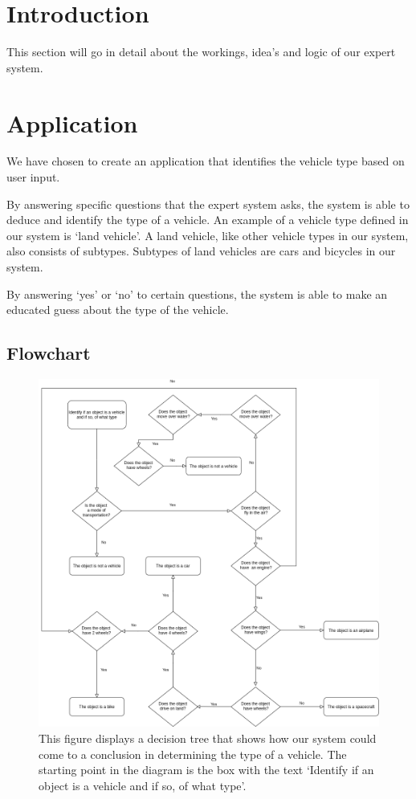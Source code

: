 \section{Introduction} \label{man-introduction}
This section will go in detail about the workings, idea's and logic of our expert system.

\section{Application} \label{man-application}
We have chosen to create an application that identifies the vehicle type based on user input.

By answering specific questions that the expert system asks,
the system is able to deduce and identify the type of a vehicle.
An example of a vehicle type defined in our system is `land vehicle'.
A land vehicle, like other vehicle types in our system, also consists
of subtypes. Subtypes of land vehicles are cars and bicycles in our system.

By answering `yes' or `no' to certain questions,
the system is able to make an educated
guess about the type of the vehicle.

\subsection{Flowchart} \label{man-diagram-application}
\begin{figure}[H]
  \includegraphics[width=\linewidth]{images/flowchart-prolog-vehicle-expert-system.png}
  \caption{This figure displays a decision tree that shows how our system could
  come to a conclusion in determining the type of a vehicle. The starting point
  in the diagram is the box with the text `Identify if an object is a vehicle
  and if so, of what type'.}
  \label{fig:flowchart-expert-system}
\end{figure}



